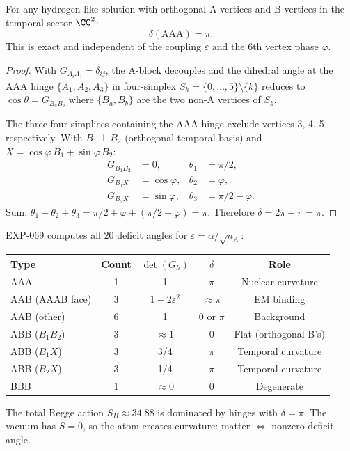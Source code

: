\begin{theorem}
\label{thm:delta_AAA}
For any hydrogen-like solution with orthogonal A-vertices and B-vertices in the temporal sector $\CC^2$:
\begin{equation}
\boxed{\delta(\mathrm{AAA}) = \pi.}
\end{equation}
This is exact and independent of the coupling $\varepsilon$ and the 6th vertex phase $\varphi$.
\end{theorem}
\begin{proof}
With $G_{A_i A_j} = \delta_{ij}$, the A-block decouples and the dihedral angle at the AAA hinge $\{A_1,A_2,A_3\}$ in four-simplex $S_k = \{0,\ldots,5\}\setminus\{k\}$ reduces to $\cos\theta = G_{B_a B_b}$ where $\{B_a,B_b\}$ are the two non-A vertices of $S_k$.

The three four-simplices containing the AAA hinge exclude vertices 3, 4, 5 respectively.  With $B_1 \perp B_2$ (orthogonal temporal basis) and $X = \cos\varphi\,B_1 + \sin\varphi\,B_2$:
\begin{align}
G_{B_1 B_2} &= 0, & \theta_1 &= \pi/2, \\
G_{B_1 X} &= \cos\varphi, & \theta_2 &= \varphi, \\
G_{B_2 X} &= \sin\varphi, & \theta_3 &= \pi/2 - \varphi.
\end{align}
Sum: $\theta_1 + \theta_2 + \theta_3 = \pi/2 + \varphi + (\pi/2 - \varphi) = \pi$.  Therefore $\delta = 2\pi - \pi = \pi$.
\end{proof}

\begin{remark}
EXP-069 computes all 20 deficit angles for $\varepsilon = \alpha/\sqrt{n_A}$:
\begin{center}
\begin{tabular}{lcccc}
\hline
Type & Count & $\det(G_h)$ & $\delta$ & Role \\
\hline
AAA & 1 & 1 & $\pi$ & Nuclear curvature \\
AAB (AAAB face) & 3 & $1-2\varepsilon^2$ & $\approx \pi$ & EM binding \\
AAB (other) & 6 & 1 & $0$ or $\pi$ & Background \\
ABB ($B_1 B_2$) & 3 & $\approx 1$ & $0$ & Flat (orthogonal B's) \\
ABB ($B_1 X$) & 3 & 3/4 & $\pi$ & Temporal curvature \\
ABB ($B_2 X$) & 3 & 1/4 & $\pi$ & Temporal curvature \\
BBB & 1 & $\approx 0$ & 0 & Degenerate \\
\hline
\end{tabular}
\end{center}
The total Regge action $S_H \approx 34.88$ is dominated by hinges with $\delta = \pi$.  The vacuum has $S = 0$, so the atom creates curvature: matter $\Leftrightarrow$ nonzero deficit angle.
\end{remark}

